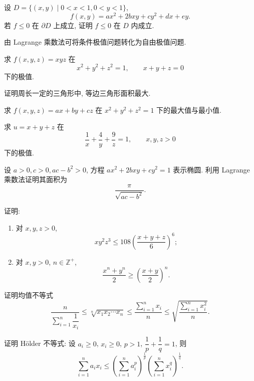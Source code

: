\documentclass[../../数学分析培优讲义.tex]{subfiles}
\begin{document}
\begin{example}
设 $D=\{(x,y)\mid0<x<1,0<y<1\}$,
\[
    f(x,y)=ax^2+2bxy+cy^2+dx+ey.
\]
若 $f\leq0$ 在 $\partial D$ 上成立, 证明 $f\leq0$ 在 $D$ 内成立.
\end{example}
\exampleblank




由 Lagrange 乘数法可将条件极值问题转化为自由极值问题.

\begin{example}
求 $f(x,y,z)=xyz$ 在
\[
    x^2+y^2+z^2=1,
    \qquad x+y+z=0
\]
下的极值.
\end{example}
\exampleblank

\begin{example}
证明周长一定的三角形中, 等边三角形面积最大.
\end{example}
\exampleblank

\begin{example}
求 $f(x,y,z)=ax+by+cz$ 在 $x^2+y^2+z^2=1$ 下的最大值与最小值.
\end{example}
\exampleblank

\begin{example}
求 $u=x+y+z$ 在
\[
    \dfrac{1}{x}+\dfrac{4}{y}+\dfrac{9}{z}=1,
    \qquad x,y,z>0
\]
下的极值.
\end{example}
\exampleblank

\begin{example}[\markstar]
设 $a>0,c>0,ac-b^2>0$, 方程 $ax^2+2bxy+cy^2=1$ 表示椭圆. 利用 Lagrange 乘数法证明其面积为
\[
    \dfrac{\pi}{\sqrt{ac-b^2}}.
\]
\end{example}
\exampleblank

\begin{example}
证明:
\begin{enumerate}[label=(\arabic*)]
    \item 对 $x,y,z>0$,
    \[
        xy^2z^3\leq108\left(\dfrac{x+y+z}{6}\right)^6;
    \]
    \item 对 $x,y>0$, $n\in\mathbb{Z}^+$,
    \[
        \dfrac{x^n+y^n}{2}\geq\left(\dfrac{x+y}{2}\right)^n.
    \]
\end{enumerate}
\end{example}
\exampleblank

\begin{example}[\markstar]
证明均值不等式
\[
    \dfrac{n}{\displaystyle\sum\limits_{i=1}^n\dfrac{1}{x_i}}
    \leq\sqrt[n]{x_1x_2\cdots x_n}
    \leq\dfrac{\displaystyle\sum\limits_{i=1}^n x_i}{n}
    \leq\sqrt{\dfrac{\displaystyle\sum\limits_{i=1}^n x_i^2}{n}}.
\]
\end{example}
\exampleblank

\begin{example}[\markstar]
证明 H\"older 不等式: 设 $a_i\geq0$, $x_i\geq0$, $p>1$, $\dfrac{1}{p}+\dfrac{1}{q}=1$, 则
\[
    \sum\limits_{i=1}^na_ix_i
    \leq\left(\sum\limits_{i=1}^na_i^p\right)^{\frac{1}{p}}
    \left(\sum\limits_{i=1}^nx_i^q\right)^{\frac{1}{q}}.
\]
\end{example}
\exampleblank
\end{document}
